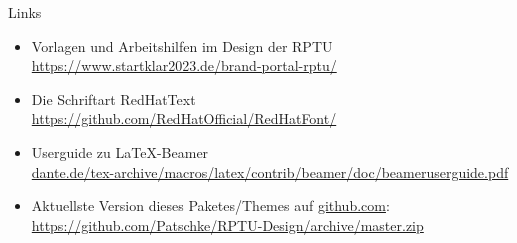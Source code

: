 \documentclass[german,10pt,xcolor=colortbl,compress
]{beamer}
\begin{document}
\begin{frame}{Links}
	\begin{itemize}
		\item Vorlagen und Arbeitshilfen im Design der RPTU\\ \href{https://www.startklar2023.de/brand-portal-rptu/}{https://www.startklar2023.de/brand-portal-rptu/}
		\item Die Schriftart RedHatText\\
		      \href{https://github.com/RedHatOfficial/RedHatFont/}{https://github.com/RedHatOfficial/RedHatFont/}
		\item Userguide zu \LaTeX-Beamer\\ \href{ftp://ftp.dante.de/tex-archive/macros/latex/contrib/beamer/doc/beameruserguide.pdf}{dante.de/tex-archive/macros/latex/contrib/beamer/doc/beameruserguide.pdf}
		\item Aktuellste Version dieses Paketes/Themes auf \href{http://github.com}{github.com}:\\
		      \href{https://github.com/Patschke/RPTU-Design/archive/master.zip}{https://github.com/Patschke/RPTU-Design/archive/master.zip}
	\end{itemize}
\end{frame}
\end{document}
